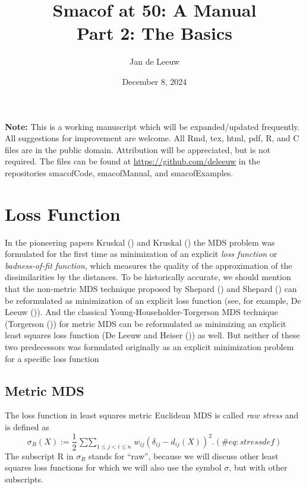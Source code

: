 \documentclass[
  12pt,
  letterpaper,
  DIV=11,
  numbers=noendperiod]{scrartcl}
\title{Smacof at 50: A Manual\\
Part 2: The Basics}
\author{Jan de Leeuw}
\date{December 8, 2024}
\newcommand{\sectionbreak}{\clearpage}
\renewcommand*\contentsname{Table of contents}
\newcommand\contentsname{Table of contents}
\theoremstyle{plain}
\theoremstyle{remark}
\begin{document}
\maketitle

\renewcommand*\contentsname{Table of contents}
{
\hypersetup{linkcolor=}
\setcounter{tocdepth}{3}
\tableofcontents
}

\textbf{Note:} This is a working manuscript which will be
expanded/updated frequently. All suggestions for improvement are
welcome. All Rmd, tex, html, pdf, R, and C files are in the public
domain. Attribution will be appreciated, but is not required. The files
can be found at \url{https://github.com/deleeuw} in the repositories
smacofCode, smacofManual, and smacofExamples.

\sectionbreak

\section{Loss Function}\label{loss-function}

In the pioneering papers Kruskal () and
Kruskal () the MDS problem was
formulated for the first time as minimization of an explicit \emph{loss
function} or \emph{badness-of-fit function}, which measures the quality
of the approximation of the dissimilarities by the distances. To be
historically accurate, we should mention that the non-metric MDS
technique proposed by Shepard () and
Shepard () can be reformulated as
minimization of an explicit loss function (see, for example, De Leeuw
()). And the classical
Young-Householder-Torgerson MDS technique (Torgerson
()) for metric MDS can be reformulated
as minimizing an explicit least squares loss function (De Leeuw and
Heiser ()) as well. But neither
of these two predecessors was formulated originally as an explicit
minimization problem for a specific loss function

\subsection{Metric MDS}\label{metric-mds}

The loss function in least squares metric Euclidean MDS is called
\emph{raw stress} and is defined as \begin{equation}
\sigma_R(X):=\frac12\mathop{\sum\sum}_{1\leq j<i\leq n}w_{ij}(\delta_{ij}-d_{ij}(X))^2.
(\#eq:stressdef)
\end{equation} The subscript R in \(\sigma_R\) stands for ``raw'',
because we will discuss other least squares loss functions for which we
will also use the symbol \(\sigma\), but with other subscripts.
\end{document}
